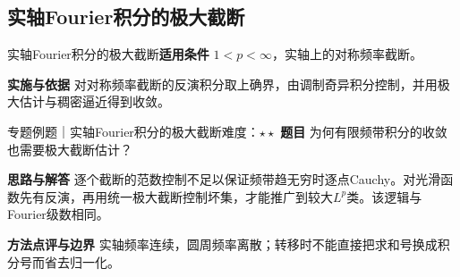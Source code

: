\subsection{实轴Fourier积分的极大截断}\label{mat:fourier_transform:realmax}
\begin{method}{实轴Fourier积分的极大截断}\textbf{适用条件} $1<p<\infty$，实轴上的对称频率截断。\par\textbf{实施与依据} 对对称频率截断的反演积分取上确界，由调制奇异积分控制，并用极大估计与稠密逼近得到收敛。\end{method}
\begin{example}{专题例题｜实轴Fourier积分的极大截断}{难度：$\star\star$}
\textbf{题目} 为何有限频带积分的收敛也需要极大截断估计？\par\textbf{思路与解答} 逐个截断的范数控制不足以保证频带趋无穷时逐点Cauchy。对光滑函数先有反演，再用统一极大截断控制坏集，才能推广到较大$L^p$类。该逻辑与Fourier级数相同。\par\textbf{方法点评与边界} 实轴频率连续，圆周频率离散；转移时不能直接把求和号换成积分号而省去归一化。
\end{example}
